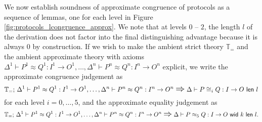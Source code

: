 
We now establish soundness of approximate congruence of protocols as a sequence of lemmas, one for each level in Figure \ref{fig:protocols_lcongruence_approx}. We note that at levels $0$ -- $2$, the length $l$ of the derivation does not factor into the final distinguishing advantage because it is always $0$ by construction. If we wish to make the ambient strict theory $\mathbb{T}_=$ and the ambient approximate theory with axioms $\Delta^1 \vdash P^1 \approx Q^1 : I^1 \to O^1, \ldots, \Delta^n \vdash P^n \approx Q^n : I^n \to O^n$ explicit, we write the approximate congruence judgement as
\[\mathbb{T}_=; \, \Delta^1 \vdash P^1 \approx Q^1 : I^1 \to O^1, \ldots, \Delta^n \vdash P^n \approx Q^n : I^n \to O^n \; \mathlarger{\mathlarger{\Rightarrow}} \; \Delta \vdash \lapproxcong{P}{Q}{I}{O}{l}{i}\]
for each level $i = 0,\ldots,5$, and the approximate equality judgement as
\[\mathbb{T}_=; \, \Delta^1 \vdash P^1 \approx Q^1 : I^1 \to O^1, \ldots, \Delta^n \vdash P^n \approx Q^n : I^n \to O^n \; \mathlarger{\mathlarger{\Rightarrow}} \; \Delta \vdash \lapproxeq{P}{Q}{I}{O}{k}{l}{5}.\]


